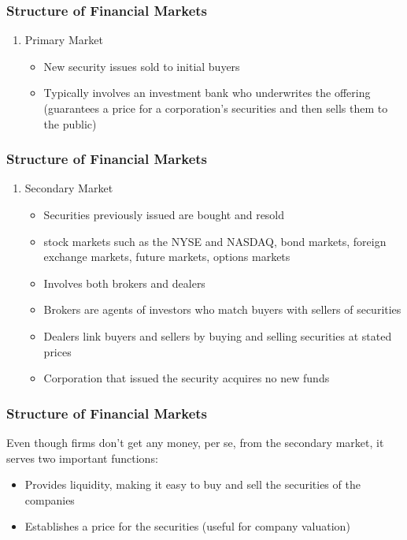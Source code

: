 \documentclass{beamer}
\begin{document}
\begin{frame}
\frametitle{Structure of Financial Markets }

\begin{enumerate}
\item Primary Market
\smallskip
\begin{itemize}
\item New security issues sold to initial buyers
\item Typically involves an investment bank who underwrites the offering (guarantees a price for a corporation's securities and then sells them to the public) 
\end{itemize}

\end{enumerate}
\end{frame}



\begin{frame}
\frametitle{Structure of Financial Markets }

\begin{enumerate}

\item Secondary Market
\smallskip
\begin{itemize}
\item Securities previously issued are bought and resold
\item stock markets such as the NYSE and NASDAQ, bond markets, foreign exchange markets, future markets, options markets
\item Involves both brokers and dealers
\item Brokers are agents of investors who match buyers with sellers of securities
\item Dealers link buyers and sellers by buying and selling securities at stated prices
\item Corporation that issued the security acquires no new funds

\end{itemize}
\end{enumerate}
\end{frame}


\begin{frame}
\frametitle{Structure of Financial Markets }

Even though firms don't get any money, per se, from the secondary market, it serves two important functions:
\smallskip
\begin{itemize}
\item Provides liquidity, making it easy to buy and sell the securities of the companies
\item Establishes a price for the securities (useful for company valuation)
\end{itemize}

\end{frame}
\end{document}
